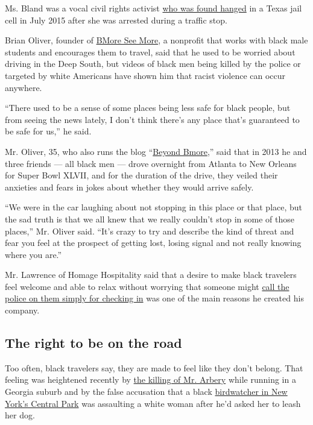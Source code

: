 Ms. Bland was a vocal civil rights activist
\href{https://www.nytimes3xbfgragh.onion/2019/05/07/us/sandra-bland-brian-encinia.html}{who
was found hanged} in a Texas jail cell in July 2015 after she was
arrested during a traffic stop.

Brian Oliver, founder of \href{https://bmoreseemore.org/}{BMore See
More}, a nonprofit that works with black male students and encourages
them to travel, said that he used to be worried about driving in the
Deep South, but videos of black men being killed by the police or
targeted by white Americans have shown him that racist violence can
occur anywhere.

``There used to be a sense of some places being less safe for black
people, but from seeing the news lately, I don't think there's any place
that's guaranteed to be safe for us,'' he said.

Mr. Oliver, 35, who also runs the blog
``\href{https://beyondbmore.com/}{Beyond Bmore},'' said that in 2013 he
and three friends --- all black men --- drove overnight from Atlanta to
New Orleans for Super Bowl XLVII, and for the duration of the drive,
they veiled their anxieties and fears in jokes about whether they would
arrive safely.

``We were in the car laughing about not stopping in this place or that
place, but the sad truth is that we all knew that we really couldn't
stop in some of those places,'' Mr. Oliver said. ``It's crazy to try and
describe the kind of threat and fear you feel at the prospect of getting
lost, losing signal and not really knowing where you are.''

Mr. Lawrence of Homage Hospitality said that a desire to make black
travelers feel welcome and able to relax without worrying that someone
might
\href{https://www.nytimes3xbfgragh.onion/2018/05/08/us/airbnb-black-women-police.html}{call
the police on them simply for checking in} was one of the main reasons
he created his company.

\hypertarget{the-right-to-be-on-the-road}{%
\subsection{The right to be on the
road}\label{the-right-to-be-on-the-road}}

Too often, black travelers say, they are made to feel like they don't
belong. That feeling was heightened recently by
\href{https://www.nytimes3xbfgragh.onion/article/ahmaud-arbery-shooting-georgia.html}{the
killing of Mr. Arbery} while running in a Georgia suburb and by the
false accusation that a black
\href{https://www.nytimes3xbfgragh.onion/2020/05/27/nyregion/amy-cooper-christian-central-park-video.html}{birdwatcher
in New York's Central Park} was assaulting a white woman after he'd
asked her to leash her dog.

